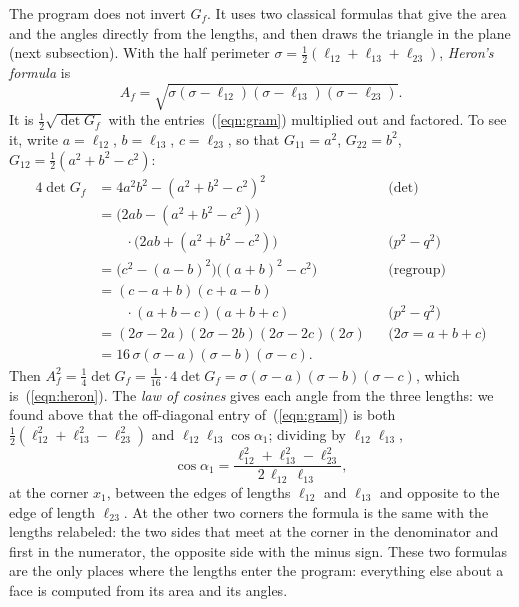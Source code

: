The program does not invert $G_f$. It uses two classical formulas that give the area and the angles directly from the lengths, and then draws the triangle in the plane (next subsection). With the half perimeter $\sigma = \frac12 (\ell_{12} + \ell_{13} + \ell_{23})$, \emph{Heron's formula} is
\begin{equation}
\label{eqn:heron}
A_f = \sqrt{\sigma (\sigma - \ell_{12})(\sigma - \ell_{13})(\sigma - \ell_{23})} .
\end{equation}
It is $\frac12 \sqrt{\det G_f}$ with the entries~(\ref{eqn:gram}) multiplied out and factored. To see it, write $a = \ell_{12}$, $b = \ell_{13}$, $c = \ell_{23}$, so that $G_{11} = a^2$, $G_{22} = b^2$, $G_{12} = \frac12(a^2 + b^2 - c^2)$:
\begin{align*}
4\det G_f &= 4a^2b^2 - (a^2 + b^2 - c^2)^2 && \text{($\det$)} \\
&= \big(2ab - (a^2 + b^2 - c^2)\big) \\ &\qquad\cdot\big(2ab + (a^2 + b^2 - c^2)\big) && \text{($p^2 - q^2$)} \\
&= \big(c^2 - (a - b)^2\big)\big((a + b)^2 - c^2\big) && \text{(regroup)} \\
&= (c - a + b)(c + a - b) \\ &\qquad\cdot(a + b - c)(a + b + c) && \text{($p^2 - q^2$)} \\
&= (2\sigma - 2a)(2\sigma - 2b)(2\sigma - 2c)(2\sigma) && \text{($2\sigma = a{+}b{+}c$)} \\
&= 16\, \sigma(\sigma - a)(\sigma - b)(\sigma - c) .
\end{align*}
Then $A_f^2 = \frac14\det G_f = \frac{1}{16}\cdot 4\det G_f = \sigma(\sigma - a)(\sigma - b)(\sigma - c)$, which is~(\ref{eqn:heron}). The \emph{law of cosines} gives each angle from the three lengths: we found above that the off-diagonal entry of~(\ref{eqn:gram}) is both $\frac12(\ell_{12}^2 + \ell_{13}^2 - \ell_{23}^2)$ and $\ell_{12}\ell_{13}\cos\alpha_1$; dividing by $\ell_{12}\ell_{13}$,
\begin{equation}
\label{eqn:law_of_cosines}
\cos\alpha_1 = \frac{\ell_{12}^2 + \ell_{13}^2 - \ell_{23}^2}{2\, \ell_{12}\, \ell_{13}} ,
\end{equation}
at the corner $x_1$, between the edges of lengths $\ell_{12}$ and $\ell_{13}$ and opposite to the edge of length $\ell_{23}$. At the other two corners the formula is the same with the lengths relabeled: the two sides that meet at the corner in the denominator and first in the numerator, the opposite side with the minus sign. These two formulas are the only places where the lengths enter the program: everything else about a face is computed from its area and its angles.

